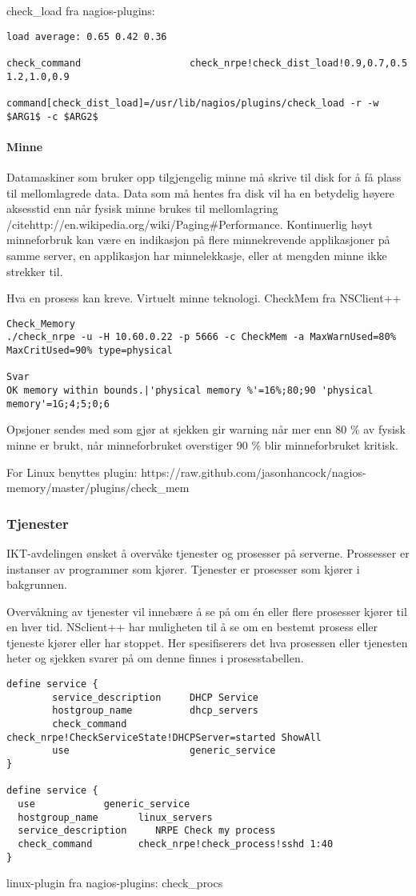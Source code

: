 check\_load fra nagios-plugins:
\begin{lstlisting}
load average: 0.65 0.42 0.36

check_command                   check_nrpe!check_dist_load!0.9,0.7,0.5 1.2,1.0,0.9

command[check_dist_load]=/usr/lib/nagios/plugins/check_load -r -w $ARG1$ -c $ARG2$
\end{lstlisting}

\paragraph{Minne}
Datamaskiner som bruker opp tilgjengelig minne må skrive til disk for å få plass til mellomlagrede data. Data som må hentes fra disk vil ha en betydelig høyere aksesstid enn når fysisk minne brukes til mellomlagring /cite{http://en.wikipedia.org/wiki/Paging#Performance}. 
Kontinuerlig høyt minneforbruk kan være en indikasjon på flere minnekrevende applikasjoner på samme server, en applikasjon har minnelekkasje, eller at mengden minne ikke strekker til.

Hva en prosess kan kreve. Virtuelt minne teknologi. CheckMem fra NSClient++

\begin{lstlisting}
Check_Memory
./check_nrpe -u -H 10.60.0.22 -p 5666 -c CheckMem -a MaxWarnUsed=80% MaxCritUsed=90% type=physical

Svar
OK memory within bounds.|'physical memory %'=16%;80;90 'physical memory'=1G;4;5;0;6
\end{lstlisting}

Opsjoner sendes med som gjør at sjekken gir warning når mer enn 80 \% av fysisk minne er brukt, når minneforbruket overstiger 90 \% blir minneforbruket kritisk.

For Linux benyttes plugin: https://raw.github.com/jasonhancock/nagios-memory/master/plugins/check\_mem

\subsubsection{Tjenester}
IKT-avdelingen ønsket å overvåke tjenester og prosesser på serverne. Prossesser er instanser av programmer som kjører. Tjenester er prosesser som kjører i bakgrunnen. 

Overvåkning av tjenester vil innebære å se på om én eller flere prosesser kjører
til en hver tid. NSclient++ har muligheten til å se om en bestemt prosess eller tjeneste kjører eller har stoppet. Her spesifiserers det hva prosessen eller tjenesten heter og sjekken svarer på om denne finnes i prosesstabellen.
\begin{lstlisting}
define service {
        service_description     DHCP Service
        hostgroup_name          dhcp_servers
        check_command           check_nrpe!CheckServiceState!DHCPServer=started ShowAll
        use                     generic_service
}

define service {
  use            generic_service
  hostgroup_name       linux_servers
  service_description     NRPE Check my process
  check_command        check_nrpe!check_process!sshd 1:40
}
\end{lstlisting}
linux-plugin fra nagios-plugins: check\_procs 


